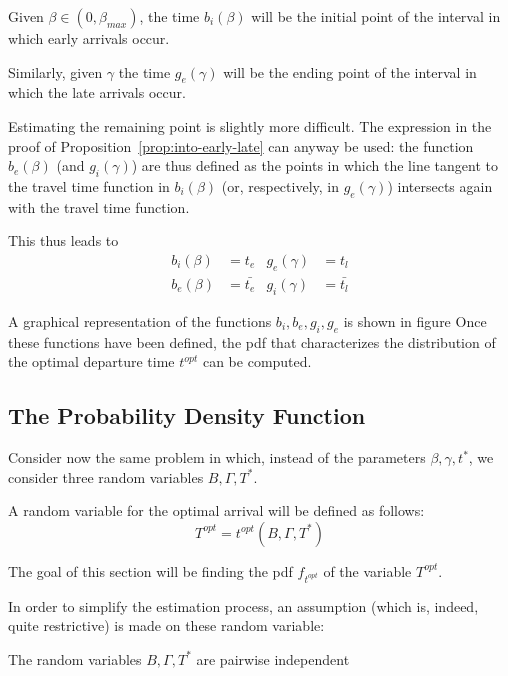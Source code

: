 Given \(\beta \in (0, \beta_{max})\),
the time \(b_i(\beta)\) will be the initial point of the interval in which early arrivals occur.

Similarly, given \(\gamma\) the time \(g_e(\gamma)\) will be the ending point of the interval in which the late arrivals occur.

Estimating the remaining point is slightly more difficult.
The expression in the proof of Proposition~\ref{prop:into-early-late} can anyway be used:
the function \(b_e(\beta)\) (and \(g_i(\gamma)\))
are thus defined as the points in which the line tangent to the travel time function in \(b_i(\beta)\) (or, respectively, in \(g_e(\gamma)\)) intersects again with the travel time function.

This thus leads to
\begin{align*}
  b_i(\beta) & = t_e & g_e(\gamma) & = t_l \\
  b_e(\beta) & = \bar{t_e} & g_i(\gamma) & = \bar{t_l}
\end{align*}

A graphical representation of the functions \(b_i, b_e, g_i, g_e\) is shown in figure
Once these functions have been defined,
the pdf that characterizes the distribution of the optimal departure time \(t^{opt}\) can be computed.

\subsection{The Probability Density Function}

Consider now the same problem in which,
instead of the parameters \(\beta, \gamma, t^*\),
we consider three random variables \(B, \Gamma, T^*\).

A random variable for the optimal arrival will be defined as follows:
\begin{equation}
  \label{eq:rv-opt-arr}
  T^{opt} = t^{opt}(B, \Gamma, T^*)
\end{equation}

The goal of this section will be finding the pdf \(f_{t^{opt}}\) of the variable \(T^{opt}\).

In order to simplify the estimation process, an assumption (which is, indeed, quite restrictive)
is made on these random variable:

\begin{assumption}
  The random variables \(B, \Gamma, T^*\) are pairwise independent
\end{assumption}

